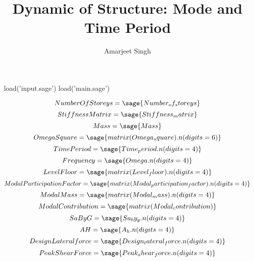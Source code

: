 \documentclass[12pt]{report}
\title{Dynamic of Structure: Mode and Time Period}
\author{Amarjeet Singh }
\begin{document}
\thispagestyle{plain}
	\begin{titlepage}
\maketitle
	\end{titlepage}

\begin{sagesilent}
load('input.sage')
load('main.sage')


\end{sagesilent}
\begin{equation}
	Number Of Storeys = \sage{Number_of_storeys}
\end{equation}
\begin{equation}
	Stiffness Matrix=\sage{Stiffness_matrix}
\end{equation}
\begin{equation}
	Mass =\sage{Mass}
\end{equation}
\begin{equation}
	Omega Square=\sage{matrix(Omega_square).n(digits=6)}
\end{equation}
\begin{equation}
	Time Period=\sage{Time_period.n(digits=4)}
\end{equation}
\begin{equation}
	Frequency=\sage{Omega.n(digits=4)}
\end{equation}
\begin{equation}
	Level Floor=\sage{matrix(Level_floor).n(digits=4)}
\end{equation}
\begin{equation}
	Modal Participation Factor = \sage{matrix(Modal_participation_factor).n(digits=4)}
\end{equation}
\begin{equation}
	Modal Mass =\sage{matrix(Modal_mass).n(digits=4)}
\end{equation}
\begin{equation}
	Modal Contribution=\sage{matrix(Modal_contribution)}
\end{equation}
\begin{equation}
	Sa By G =\sage{Sa_by_g.n(digits=4)}
\end{equation}
\begin{equation}
	A H=\sage{A_h.n(digits=4)}
\end{equation}
\begin{equation}
	Design Lateral force=\sage{Design_lateral_force.n(digits=4)}
\end{equation}
\begin{equation}
	Peak Shear Force=\sage{Peak_shear_force.n(digits=4)}
\end{equation}
\end{document}
